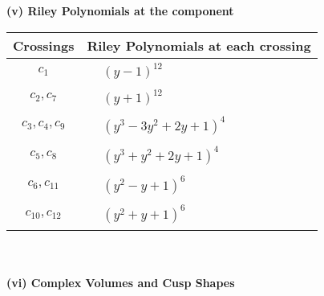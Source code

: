 \documentclass[1p]{elsarticle_modified}
\theoremstyle{definition}
\begin{document}
\newpage\renewcommand{\arraystretch}{1}
\flushleft \textbf{(v) Riley Polynomials at the component}\newline \\
\begin{tabular}{m{50pt}|m{274pt}}
Crossings & \hspace{64pt}Riley Polynomials at each crossing \\
\hline $$\begin{aligned}c_{1}\end{aligned}$$&$\begin{aligned}
&(y-1)^{12}
\end{aligned}$\\
\hline $$\begin{aligned}c_{2},c_{7}\end{aligned}$$&$\begin{aligned}
&(y+1)^{12}
\end{aligned}$\\
\hline $$\begin{aligned}c_{3},c_{4},c_{9}\end{aligned}$$&$\begin{aligned}
&(y^3-3 y^2+2 y+1)^4
\end{aligned}$\\
\hline $$\begin{aligned}c_{5},c_{8}\end{aligned}$$&$\begin{aligned}
&(y^3+y^2+2 y+1)^4
\end{aligned}$\\
\hline $$\begin{aligned}c_{6},c_{11}\end{aligned}$$&$\begin{aligned}
&(y^2- y+1)^6
\end{aligned}$\\
\hline $$\begin{aligned}c_{10},c_{12}\end{aligned}$$&$\begin{aligned}
&(y^2+y+1)^6
\end{aligned}$\\
\hline
\end{tabular}\\~\\
\newpage\flushleft \textbf{(vi) Complex Volumes and Cusp Shapes}
\end{document}
